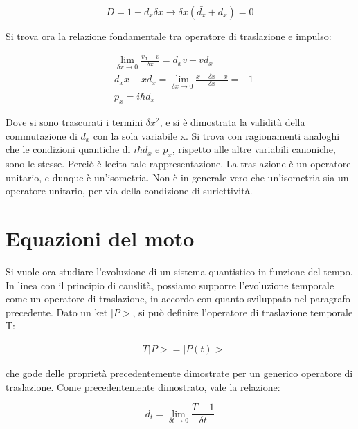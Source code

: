 \documentclass{article}
\begin{document}
\begin{equation}
    D= 1+d_x\delta x \rightarrow \delta x (\bar{d_x}+d_x)=0
\end{equation}

Si trova ora la relazione fondamentale tra operatore di traslazione e impulso:

\begin{equation}
    \begin{aligned}
        & \lim_{\delta x \rightarrow 0} \frac{v_d-v}{\delta x}= d_xv-vd_x \\
        & d_x x- xd_x= \lim_{\delta x \rightarrow 0} \frac{x-\delta x -x}{\delta x}= -1 \\
        & p_x= i\hbar d_x
    \end{aligned}
\end{equation}

Dove si sono trascurati i termini $\delta x^2$, e si è dimostrata la validità della commutazione di $d_x$ con la sola variabile x.
Si trova con ragionamenti analoghi che le condizioni quantiche di $i\hbar d_x$ e $p_x$, rispetto alle altre variabili canoniche, sono le stesse.
Perciò è lecita tale rappresentazione.
La traslazione è un operatore unitario, e dunque è un'isometria. Non è in generale vero che un'isometria sia un operatore unitario, per via
della condizione di suriettività.


\section{Equazioni del moto}
Si vuole ora studiare l'evoluzione di un sistema quantistico in funzione del tempo.
In linea con il principio di causlità, possiamo supporre l'evoluzione temporale come un operatore di traslazione, in accordo con quanto sviluppato
nel paragrafo precedente.
Dato un  ket $|P>$, si può definire l'operatore di traslazione temporale T:

\begin{equation}
    \begin{aligned}
    & T |P>= |P(t)>
    \end{aligned}
\end{equation}

che gode delle proprietà precedentemente dimostrate per un generico operatore di traslazione.
Come precedentemente dimostrato, vale la relazione:

\begin{equation}
    d_t= \lim_{\delta t \rightarrow 0} \frac{T-1}{\delta t}
\end{equation}
\end{document}
